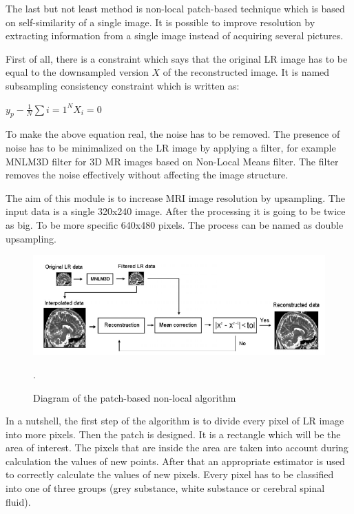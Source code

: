 The last but not least method is non-local patch-based technique which is based on self-similarity of a single image. It is possible to improve resolution by extracting information from a single image instead of acquiring several pictures.

First of all, there is a constraint which says that the original LR image has to be equal to the downsampled version $X$ of the reconstructed image. It is named subsampling consistency constraint which is written as:
\newline \centerline{$y_{p}-\frac{1}{N}\sum{i=1}^{N}X_{i}=0$}
\newline To make the above equation real, the noise has to be removed. The presence of noise has to be minimalized on the LR image by applying a filter, for example MNLM3D filter for 3D MR images based on Non-Local Means filter. The filter removes the noise effectively without affecting the image structure. 


The aim of this module is to increase MRI image resolution by upsampling.
The input data is a single 320x240 image. After the processing it
is going to be twice as big. To be more specific 640x480 pixels. The
process can be named as double upsampling.

\begin{figure}[H]
\centering{}\includegraphics[scale=0.7]{figures/Module9_1}\caption{Diagram of the patch-based non-local algorithm \cite{9art1}}. 
\label{fig:figures/Module9_1}
\end{figure}

In a nutshell, the first step of the algorithm is to divide every pixel of LR image into more pixels. Then the patch is designed. It is a rectangle which will be the area of interest. The pixels that are inside the area are taken into account during calculation the values of new points.
After that an appropriate estimator is used to correctly calculate the values of new pixels. Every pixel has to be classified into one of three groups (grey substance, white substance or cerebral spinal fluid).

